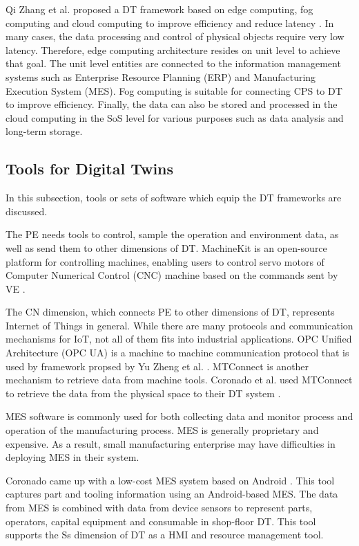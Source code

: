 \documentclass[article,table]{aaltoseries}
\begin{document}
Qi Zhang et al. proposed a DT framework based on edge computing, fog computing and cloud computing to improve efficiency and reduce latency \cite{qi2018modeling}. In many cases, the data processing and control of physical objects require very low latency. Therefore, edge computing architecture resides on unit level to achieve that goal. The unit level entities are connected to the information management systems such as Enterprise Resource Planning (ERP) and Manufacturing Execution System (MES). Fog computing is suitable for connecting CPS to DT to improve efficiency. Finally, the data can also be stored and processed in the cloud computing in the SoS level for various purposes such as data analysis and long-term storage.

\subsection{Tools for Digital Twins}
In this subsection, tools or sets of software which equip the DT frameworks are discussed. 

The PE needs tools to control, sample the operation and environment data, as well as send them to other dimensions of DT. MachineKit is an open-source platform for controlling machines, enabling users to control servo motors of Computer Numerical Control (CNC) machine based on the commands sent by VE \cite{lynn2018realization}.

The CN dimension, which connects PE to other dimensions of DT, represents Internet of Things in general. While there are many protocols and communication mechanisms for IoT, not all of them fits into industrial applications. OPC Unified Architecture (OPC UA) is a machine to machine communication protocol that is used by framework propsed by Yu Zheng et al. \cite{zheng2019application}. MTConnect is another mechanism to retrieve data from machine tools. Coronado et al. used MTConnect to retrieve the data from the physical space to their DT system \cite{UrbinaCoronado2018}.

MES software is commonly used for both collecting data and monitor process and operation of the manufacturing process. MES is generally proprietary and expensive. As a result, small manufacturing enterprise may have difficulties in deploying MES in their system.

Coronado  came up with a low-cost MES system based on Android \cite{UrbinaCoronado2018}. This tool captures part and tooling information using an Android-based MES. The data from MES is combined with data from device sensors to represent parts, operators, capital equipment and consumable in shop-floor DT. This tool supports the Ss dimension of DT as a HMI and resource management tool.
\end{document}

